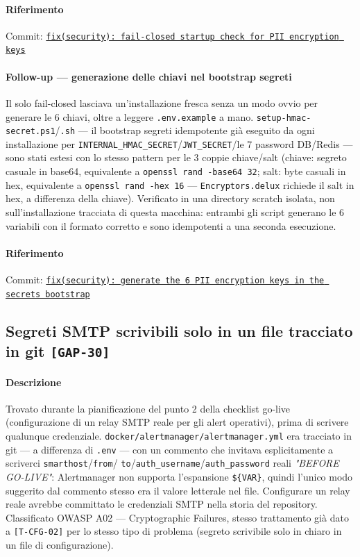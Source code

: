 ﻿\documentclass[a4paper,12pt]{report}
\newcommand{\commitref}[2]{\texttt{\small \href{https://github.com/diegoandruccioli/hotel-pms/commit/#1}{#2}}}
\newcommand{\threat}[1]{\texttt{\small\textcolor{vulnred}{[#1]}}}
\begin{document}
\paragraph{Riferimento} Commit: \commitref{991436f5}{fix(security): fail-closed startup check for PII encryption keys}

\paragraph{Follow-up --- generazione delle chiavi nel bootstrap segreti}
Il solo fail-closed lasciava un'installazione fresca senza un modo ovvio
per generare le 6 chiavi, oltre a leggere \texttt{.env.example} a mano.
\texttt{setup-hmac-secret.ps1}/\texttt{.sh} --- il bootstrap segreti
idempotente già eseguito da ogni installazione per
\texttt{INTERNAL\_HMAC\_SECRET}/\texttt{JWT\_SECRET}/le 7 password
DB/Redis --- sono stati estesi con lo stesso pattern per le 3 coppie
chiave/salt (chiave: segreto casuale in base64, equivalente a
\texttt{openssl rand -base64 32}; salt: byte casuali in hex, equivalente
a \texttt{openssl rand -hex 16} --- \texttt{Encryptors.delux} richiede il
salt in hex, a differenza della chiave). Verificato in una directory
scratch isolata, non sull'installazione tracciata di questa macchina:
entrambi gli script generano le 6 variabili con il formato corretto e
sono idempotenti a una seconda esecuzione.

\paragraph{Riferimento} Commit: \commitref{8b9727bf}{fix(security): generate the 6 PII encryption keys in the secrets bootstrap}

\subsection{Segreti SMTP scrivibili solo in un file tracciato in git \threat{GAP-30}}

\paragraph{Descrizione}
Trovato durante la pianificazione del punto 2 della checklist go-live
(configurazione di un relay SMTP reale per gli alert operativi), prima
di scrivere qualunque credenziale. \texttt{docker/alertmanager/alertmanager.yml}
era tracciato in git --- a differenza di \texttt{.env} --- con un commento
che invitava esplicitamente a scriverci \texttt{smarthost}/\texttt{from}/
\texttt{to}/\texttt{auth\_username}/\texttt{auth\_password} reali
\emph{"BEFORE GO-LIVE"}: Alertmanager non supporta l'espansione
\texttt{\$\{VAR\}}, quindi l'unico modo suggerito dal commento stesso era
il valore letterale nel file. Configurare un relay reale avrebbe
committato le credenziali SMTP nella storia del repository. Classificato
OWASP A02 --- Cryptographic Failures, stesso trattamento già dato a
\threat{T-CFG-02} per lo stesso tipo di problema (segreto scrivibile solo
in chiaro in un file di configurazione).
\end{document}
